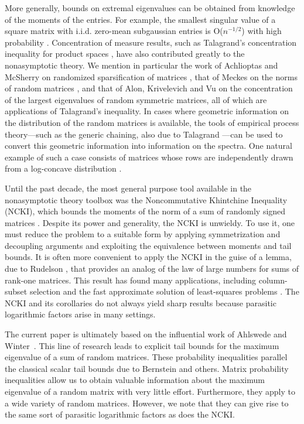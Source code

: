 \documentclass[11pt,letterpaper,twoside,reqno,nosumlimits]{amsart}
\theoremstyle{remark}
\numberwithin{equation}{section}
\numberwithin{thm}{section}
\numberwithin{prop}{section}
\numberwithin{defn}{section}
\numberwithin{remark}{section}
\begin{document}
More generally, bounds on extremal eigenvalues can be obtained from knowledge of the moments of the entries. For example, the smallest singular value of a square matrix with i.i.d. zero-mean subgaussian entries is O($n^{-1/2}$) with high probability \cite{RV08}. Concentration of measure results, such as Talagrand's concentration inequality for product spaces \cite{Talagrand95}, have also contributed greatly to the nonasymptotic theory. We mention in particular the work of Achlioptas and McSherry on randomized sparsification of matrices \cite{AM01,AM07}, that of Meckes on the norms of random matrices \cite{Meckes04}, and that of Alon, Krivelevich and Vu \cite{AlonKrivelevichVu02} on the concentration of the largest eigenvalues of random symmetric matrices, all of which are applications of Talagrand's inequality. In cases where geometric information on the distribution of the random matrices is available, the tools of empirical process theory---such as the generic chaining, also due to Talagrand \cite{Talagrand05}---can be used to convert this geometric information into information on the spectra. One natural example of such a case consists of matrices whose rows are independently drawn from a log-concave distribution \cite{MendelsonPajor06,ALPT10b}.

Until the past decade, the most general purpose tool available in the nonasymptotic theory toolbox was the Noncommutative Khintchine Inequality (NCKI), which bounds the moments of the norm of a sum of randomly signed matrices \cite{Lust-PiquardPisier91}. Despite its power and generality, the NCKI is unwieldy. To use it, one must reduce the problem to a suitable form by applying symmetrization and decoupling arguments and exploiting the equivalence between moments and tail bounds. It is often more convenient to apply the NCKI in the guise of a lemma, due to Rudelson \cite{RU99}, that provides an analog of the law of large numbers for sums of rank-one matrices. This result has found many applications, including column-subset selection \cite{RV07} and the fast approximate solution of least-squares problems \cite{DMMS11}. The NCKI and its corollaries do not always yield sharp results because parasitic logarithmic factors arise in many settings.

The current paper is ultimately based on the influential work of Ahlswede and Winter~\cite{AW02}. This line of research leads to explicit tail bounds for the maximum eigenvalue of a sum of random matrices. These probability inequalities parallel the classical scalar tail bounds due to Bernstein and others. Matrix probability inequalities allow us to obtain valuable information about the maximum eigenvalue of a random matrix with very little effort. Furthermore, they apply to a wide variety of random matrices. However, we note that they can give rise to the same sort of parasitic logarithmic factors as does the NCKI.
\end{document}
